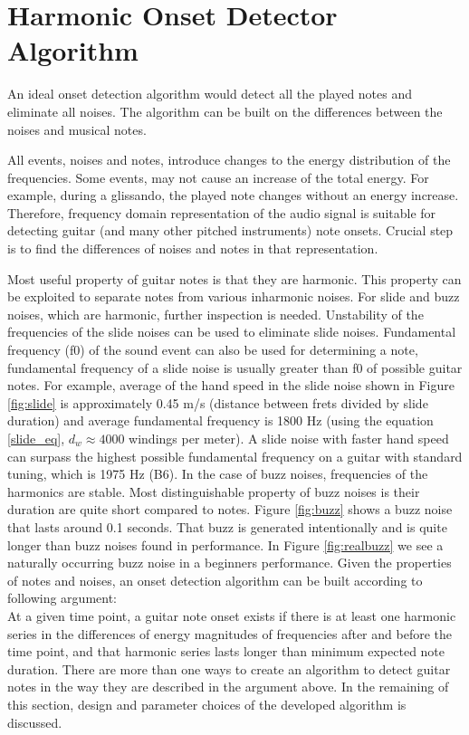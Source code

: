 \chapter{Harmonic Onset Detector Algorithm}

An ideal onset detection algorithm would detect all the played notes and eliminate all noises. The algorithm can be built on the differences between the noises and musical notes.   

All events, noises and notes, introduce changes to the energy distribution of the frequencies. Some events, may not cause an increase of the total energy. For example, during a glissando, the played note changes without an energy increase. Therefore, frequency domain representation of the audio signal is suitable for detecting guitar (and many other pitched instruments) note onsets. Crucial step is to find the differences of noises and notes in that representation.

Most useful property of guitar notes is that they are harmonic. This property can be exploited to separate notes from various inharmonic noises. For slide and buzz noises, which are harmonic, further inspection is needed. Unstability of the frequencies of the slide noises can be used to eliminate slide noises. Fundamental frequency (f0) of the sound event can also be used for determining a note, fundamental frequency of a slide noise is usually greater than f0 of possible guitar notes. For example, average of the hand speed in the slide noise shown in Figure \ref{fig:slide} is approximately 0.45 m/s (distance between frets divided by slide duration) and average fundamental frequency is 1800 Hz (using the equation \ref{slide_eq}, \(d_w \approx 4000 \) windings per meter). A slide noise with faster hand speed can surpass the highest possible fundamental frequency on a guitar with standard tuning, which is 1975 Hz (B6). In the case of buzz noises, frequencies of the harmonics are stable. Most distinguishable property of buzz noises is their duration are quite short compared to notes. Figure \ref{fig:buzz} shows a buzz noise that lasts around 0.1 seconds. That buzz is generated intentionally and is quite longer than buzz noises found in performance. In Figure \ref{fig:realbuzz} we see a naturally occurring buzz noise in a beginners performance. Given the properties of notes and noises, an onset detection algorithm can be built according to following argument: \\ At a given time point, a guitar note onset exists if there is at least one harmonic series in the differences of energy magnitudes of frequencies after and before the time point, and that harmonic series lasts longer than minimum expected note duration. There are more than one ways to create an algorithm to detect guitar notes in the way they are described in the argument above. In the remaining of this section, design and parameter choices of the developed algorithm is discussed.

